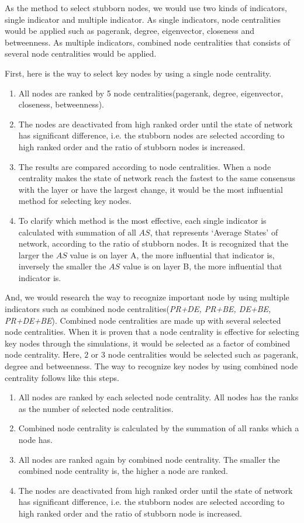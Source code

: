 As the method to select stubborn nodes, we would use two kinds of indicators, single indicator and multiple indicator. As single indicators, node centralities would be applied such as pagerank, degree, eigenvector, closeness and betweenness. As multiple indicators, combined node centralities that consists of several node centralities would be applied.
  
First, here is the way to select key nodes by using a single node centrality.
\begin{enumerate}
	\item All nodes are ranked by 5 node centralities(pagerank, degree, eigenvector, closeness, betweenness).
	\item The nodes are deactivated from high ranked order until the state of network has significant difference, i.e. the stubborn nodes are selected according to high ranked order and the ratio of stubborn nodes is increased. 
	\item The results are compared according to node centralities. When a node centrality makes the state of network reach the fastest to the same consensus with the layer or have the largest change, it would be the most influential method for selecting key nodes.
	\item To clarify which method is the most effective, each single indicator is calculated with summation of all $AS$, that represents `Average States' of network, according to the ratio of stubborn nodes. It is recognized that the larger the $AS$ value is on layer A, the more influential that indicator is, inversely the smaller the $AS$ value is on layer B, the more influential that indicator is.
	
\end{enumerate}
And, we would research the way to recognize important node by using multiple indicators such as combined node centralities(\textit{PR+DE, PR+BE, DE+BE, PR+DE+BE}). Combined node centralities are made up with several selected node centralities. When it is proven that a node centrality is effective for selecting key nodes through the simulations, it would be selected as a factor of combined node centrality. Here, $2$ or $3$ node centralities would be selected such as pagerank, degree and betweenness. 
The way to recognize key nodes by using combined node centrality follows like this steps. 
\begin{enumerate}
	\item All nodes are ranked by each selected node centrality. All nodes has the ranks as the number of selected node centralities.  
	\item Combined node centrality is calculated by the summation of all ranks which a node has. 
	\item All nodes are ranked again by combined node centrality. The smaller the combined node centrality is, the higher a node are ranked.        
	\item The nodes are deactivated from high ranked order until the state of network has significant difference, i.e. the stubborn nodes are selected according to high ranked order and the ratio of stubborn node is increased. 
\end{enumerate}
